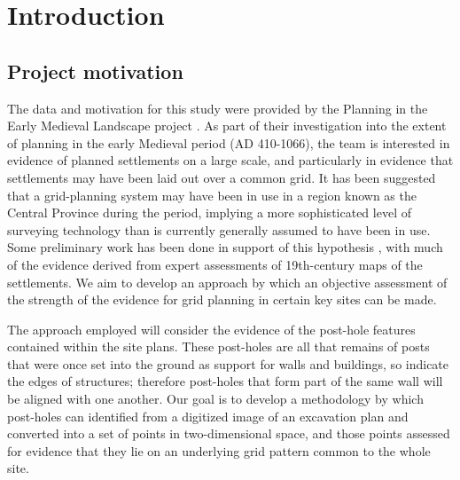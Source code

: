 \documentclass[../../ArchStats.tex]{subfiles}
\begin{document}
\section{Introduction}

\subsection{Project motivation}
The data and motivation for this study were provided by the Planning in the Early Medieval Landscape project \cite{PEML}. As part of their investigation into the extent of planning in the early Medieval period (AD 410-1066), the team is interested in evidence of planned settlements on  a large scale, and particularly in evidence that settlements may have been laid out over a common grid. It has been suggested that a grid-planning system may have been in use in a region known as the Central Province during the period, implying a more sophisticated level of surveying technology than is currently generally assumed to have been in use. Some preliminary work has been done in support of this hypothesis \cite{Blair2013}, with much of the evidence derived from expert assessments of 19th-century maps of the settlements. We aim to develop an approach by which an objective assessment of the strength of the evidence for grid planning in certain key sites can be made.

The approach employed will consider the evidence of the post-hole features contained within the site plans. These post-holes are all that remains of posts that were once set into the ground as support for walls and buildings, so indicate the edges of structures; therefore post-holes that form part of the same wall will be aligned with one another. Our goal is to develop a methodology by which post-holes can identified from  a digitized image of an excavation plan and converted into a set of points in two-dimensional space, and those points assessed for evidence that they lie on an underlying grid pattern common to the whole site. 
\end{document}
